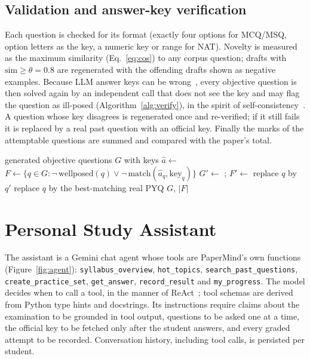 \subsection{Validation and answer-key verification}
Each question is checked for its format (exactly four options for MCQ/MSQ, option letters as the key, a numeric key or
range for NAT). Novelty is measured as the maximum similarity (Eq.~\ref{eq:cos}) to any corpus question; drafts with
$\mathrm{sim}\ge\theta=0.8$ are regenerated with the offending drafts shown as negative examples. Because LLM answer
keys can be wrong~\cite{ji2023}, every objective question is then solved again by an independent call that does not see
the key and may flag the question as ill-posed (Algorithm~\ref{alg:verify}), in the spirit of
self-consistency~\cite{wang2023sc}. A question whose key disagrees is regenerated once and re-verified; if it still fails
it is replaced by a real past question with an official key. Finally the marks of the attemptable questions are summed
and compared with the paper's total.

\begin{algorithm}[t]
\caption{Blind answer-key verification}
\label{alg:verify}
\begin{algorithmic}[1]
\Require generated objective questions $G$ with keys
\State $\hat{a} \gets$  
\State $F \gets \{q\in G : \neg\,\text{wellposed}(q) \lor \neg\,\text{match}(\hat{a}_q, \text{key}_q)\}$
\State $G' \gets$ ; \quad $F' \gets$ 
   \State replace $q$ by $q'$ \Else \State replace $q$ by the best-matching real PYQ \EndIf
\EndFor
\State \Return $G$, $|F|$
\end{algorithmic}
\end{algorithm}

\section{Personal Study Assistant}
The assistant is a Gemini chat agent whose tools are PaperMind's own functions (Figure~\ref{fig:agent}):
\texttt{syllabus\_overview}, \texttt{hot\_topics}, \texttt{search\_past\_questions}, \texttt{create\_practice\_set},
\texttt{get\_answer}, \texttt{record\_result} and \texttt{my\_progress}. The model decides when to call a tool, in the
manner of ReAct~\cite{yao2023}; tool schemas are derived from Python type hints and docstrings. Its instructions require
claims about the examination to be grounded in tool output, questions to be asked one at a time, the official key to be
fetched only after the student answers, and every graded attempt to be recorded. Conversation history, including tool
calls, is persisted per student.

